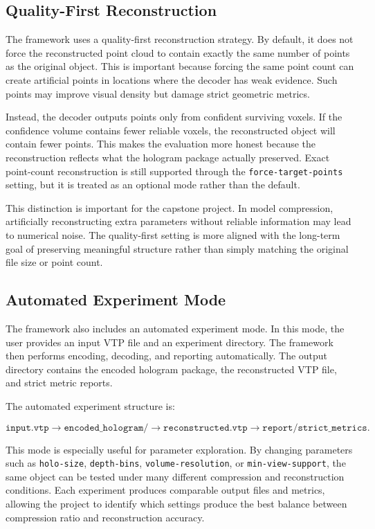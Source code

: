 \documentclass{article}
\begin{document}
\begin{normalsize}
\subsection{Quality-First Reconstruction}

The framework uses a quality-first reconstruction strategy. By default, it does not force the reconstructed point cloud to contain exactly the same number of points as the original object. This is important because forcing the same point count can create artificial points in locations where the decoder has weak evidence. Such points may improve visual density but damage strict geometric metrics.

Instead, the decoder outputs points only from confident surviving voxels. If the confidence volume contains fewer reliable voxels, the reconstructed object will contain fewer points. This makes the evaluation more honest because the reconstruction reflects what the hologram package actually preserved. Exact point-count reconstruction is still supported through the \texttt{force-target-points} setting, but it is treated as an optional mode rather than the default.

This distinction is important for the capstone project. In model compression, artificially reconstructing extra parameters without reliable information may lead to numerical noise. The quality-first setting is more aligned with the long-term goal of preserving meaningful structure rather than simply matching the original file size or point count.

\subsection{Automated Experiment Mode}

The framework also includes an automated experiment mode. In this mode, the user provides an input VTP file and an experiment directory. The framework then performs encoding, decoding, and reporting automatically. The output directory contains the encoded hologram package, the reconstructed VTP file, and strict metric reports.

The automated experiment structure is:

\[
\texttt{input.vtp}
\rightarrow
\texttt{encoded\_hologram/}
\rightarrow
\texttt{reconstructed.vtp}
\rightarrow
\texttt{report/strict\_metrics}.
\]

This mode is especially useful for parameter exploration. By changing parameters such as \texttt{holo-size}, \texttt{depth-bins}, \texttt{volume-resolution}, or \texttt{min-view-support}, the same object can be tested under many different compression and reconstruction conditions. Each experiment produces comparable output files and metrics, allowing the project to identify which settings produce the best balance between compression ratio and reconstruction accuracy.


\end{normalsize}
\end{document}
